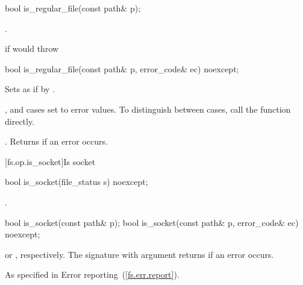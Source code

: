 %
\begin{itemdecl}
bool is_regular_file(const path& p);
\end{itemdecl}

\begin{itemdescr}
\pnum
\returns {}.

\pnum
\throws {} if  would throw 
\end{itemdescr}

%
\begin{itemdecl}
bool is_regular_file(const path& p, error_code& ec) noexcept;
\end{itemdecl}

\begin{itemdescr}
\pnum
\effects Sets  as if by . \begin{note}
,  and
   cases set  to error values. To distinguish between cases, call the  function directly. \end{note}

\pnum
\returns {}.
Returns  if an error occurs.
\end{itemdescr}


[fs.op.is_socket]{Is socket}

%
\begin{itemdecl}
bool is_socket(file_status s) noexcept;
\end{itemdecl}

\begin{itemdescr}
\pnum
\returns {}.
\end{itemdescr}

%
\begin{itemdecl}
bool is_socket(const path& p);
bool is_socket(const path& p, error_code& ec) noexcept;
\end{itemdecl}

\begin{itemdescr}
\pnum
\returns {} or
  , respectively. The signature with argument
   returns  if an error occurs.

\pnum
\throws As specified in Error reporting~(\ref{fs.err.report}).
\end{itemdescr}


